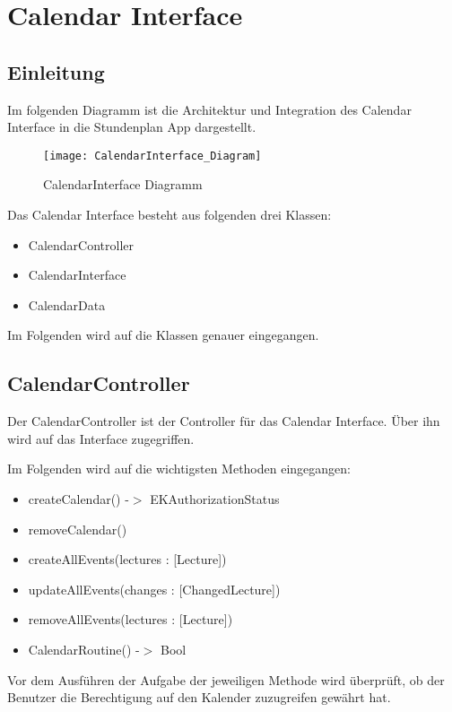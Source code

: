 \chapter{Calendar Interface}
\section{Einleitung}
Im folgenden Diagramm ist die Architektur und Integration des Calendar Interface in die Stundenplan App dargestellt.
\begin{figure}[htb]
    \centering
    \texttt{[image: CalendarInterface\_Diagram]}
    \caption{CalendarInterface Diagramm}
\end{figure}

Das Calendar Interface besteht aus folgenden drei Klassen:
\begin{itemize}
     \item CalendarController
     \item CalendarInterface
     \item CalendarData
\end{itemize}

Im Folgenden wird auf die Klassen genauer eingegangen.

\newpage
\section{CalendarController}
Der CalendarController ist der Controller für das Calendar Interface. Über ihn wird auf das Interface zugegriffen.

Im Folgenden wird auf die wichtigsten Methoden eingegangen:
\begin{itemize}
     \item createCalendar() -$>$ EKAuthorizationStatus
     \item removeCalendar()
     \item createAllEvents(lectures : [Lecture])
     \item updateAllEvents(changes : [ChangedLecture])
     \item removeAllEvents(lectures : [Lecture])
     \item CalendarRoutine() -$>$ Bool
\end{itemize}

Vor dem Ausführen der Aufgabe der jeweiligen Methode wird überprüft, ob der Benutzer die Berechtigung auf den Kalender zuzugreifen gewährt hat.

